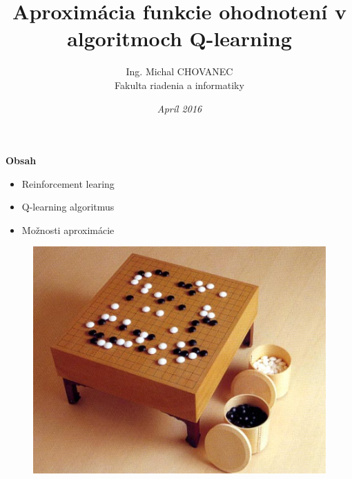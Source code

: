 \documentclass[xcolor=dvipsnames]{beamer}
\title{\bf Aproximácia funkcie ohodnotení v algoritmoch Q-learning}
\author{Ing. Michal CHOVANEC \\Fakulta riadenia a informatiky}
\date[EURP]{\it Apríl 2016}
\begin{document}
\begin{frame}
\titlepage
\end{frame}




\begin{frame}{\bf Obsah}

\begin{minipage}{.5\textwidth}

\begin{itemize}
  \item Reinforcement learing
  \item Q-learning algoritmus
  \item Možnosti aproximácie
\end{itemize}

  \end{minipage}%
\begin{minipage}{.5\textwidth}

  \begin{figure}[!htb]
  \centering
  \includegraphics[scale=.8]{../pictures/go.jpg}
  \end{figure}

\end{minipage}

\end{frame}
\end{document}
